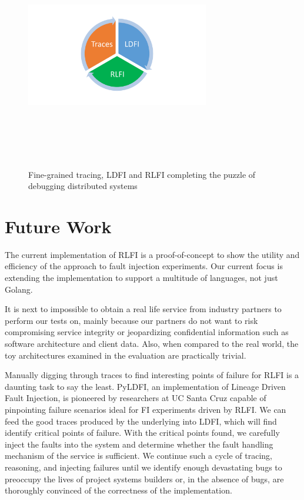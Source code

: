 

\begin{figure}
\centering
\includegraphics[width=8cm,height=10cm,keepaspectratio=true]{puzzle}
\caption{Fine-grained tracing, LDFI and RLFI completing the puzzle of debugging distributed systems}
\label{puzzle}
\end{figure}

\section{Future Work}
The current implementation of RLFI is a proof-of-concept to show the utility and efficiency of the approach to fault injection experiments. Our current focus is extending the implementation to support a multitude of languages, not just Golang. 

It is next to impossible to obtain a real life service from industry partners to perform our tests on, mainly because our partners do not want to risk compromising service integrity or jeopardizing confidential information such as software architecture and client data. Also, when compared to the real world, the toy architectures examined in the evaluation are practically trivial. 

Manually digging through traces to find interesting points of failure for RLFI is a daunting task to say the least. PyLDFI, an implementation of Lineage Driven Fault Injection, is pioneered by researchers at UC Santa Cruz  capable of pinpointing failure scenarios ideal for FI experiments driven by RLFI. We can feed the good traces produced by the underlying into LDFI, which will find identify critical points of failure. With the critical points found, we carefully inject the faults into the system and determine whether the fault handling mechanism of the service is sufficient. We continue such a cycle of tracing, reasoning, and injecting failures until we identify enough devastating bugs to preoccupy the lives of project systems builders or, in the absence of bugs, are thoroughly convinced of the correctness of the implementation.

